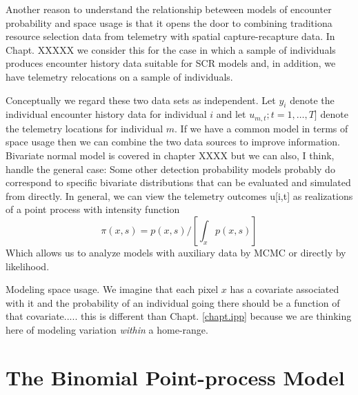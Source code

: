 Another reason to understand the relationship beteween models of
encounter probability and space usage is that it opens the door to
combining traditiona resource selection data from telemetry with
spatial capture-recapture data. 
In Chapt. XXXXX 
 we consider this for the case in which a
sample of individuals produces encounter history data suitable for SCR
models and, in addition, we have telemetry relocations on a sample of 
individuals.

Conceptually we regard these two data sets as independent. Let $y_{i}$
denote the individual encounter history data for individual $i$ and let
$u_{m,t}; t=1,\ldots,T]$ denote the telemetry locations for individual $m$. If
we have a common model in terms of space usage then we can combine the
two data sources to improve information.  Bivariate normal model is
covered in chapter XXXX but we can also, I think, handle the general
case: Some other detection probability models probably do correspond
to specific bivariate distributions that can be evaluated and
simulated from directly. In general, we can view the telemetry
outcomes u[i,t] as realizations of a point process with intensity
function
\[
\pi(x,s) = p(x,s)/[ \int_{x} p(x,s) ]
\]
Which allows us to analyze models with auxiliary data by MCMC or directly by likelihood.

Modeling space usage. We imagine that each pixel $x$ has a covariate
associated with it and the probability of an individual going there
should be a function of that covariate..... this is different than
Chapt. \ref{chapt.ipp} because we are thinking here of modeling
variation {\it within} a home-range. 









\section{ The Binomial Point-process Model}
\label{scr0.sec.bpp}

